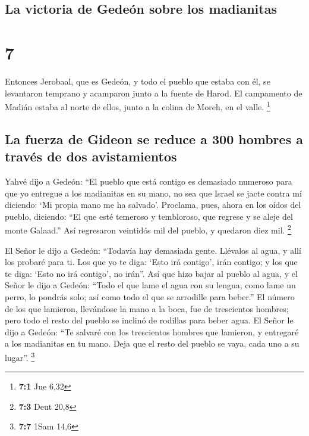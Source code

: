 \hypertarget{la-victoria-de-gedeuxf3n-sobre-los-madianitas}{%
\subsection{La victoria de Gedeón sobre los
madianitas}\label{la-victoria-de-gedeuxf3n-sobre-los-madianitas}}

\hypertarget{section-6}{%
\section{7}\label{section-6}}

 Entonces Jerobaal, que es Gedeón, y todo el pueblo que
estaba con él, se levantaron temprano y acamparon junto a la fuente de
Harod. El campamento de Madián estaba al norte de ellos, junto a la
colina de Moreh, en el valle. \footnote{\textbf{7:1} Jue 6,32}

\hypertarget{la-fuerza-de-gideon-se-reduce-a-300-hombres-a-travuxe9s-de-dos-avistamientos}{%
\subsection{La fuerza de Gideon se reduce a 300 hombres a través de dos
avistamientos}\label{la-fuerza-de-gideon-se-reduce-a-300-hombres-a-travuxe9s-de-dos-avistamientos}}

 Yahvé dijo a Gedeón: ``El pueblo que está contigo es
demasiado numeroso para que yo entregue a los madianitas en su mano, no
sea que Israel se jacte contra mí diciendo: `Mi propia mano me ha
salvado'.  Proclama, pues, ahora en los oídos del pueblo,
diciendo: ``El que esté temeroso y tembloroso, que regrese y se aleje
del monte Galaad.'' Así regresaron veintidós mil del pueblo, y quedaron
diez mil. \footnote{\textbf{7:3} Deut 20,8}

 El Señor le dijo a Gedeón: ``Todavía hay demasiada gente.
Llévalos al agua, y allí los probaré para ti. Los que yo te diga: `Esto
irá contigo', irán contigo; y los que te diga: `Esto no irá contigo', no
irán''.  Así que hizo bajar al pueblo al agua, y el Señor
le dijo a Gedeón: ``Todo el que lame el agua con su lengua, como lame un
perro, lo pondrás solo; así como todo el que se arrodille para beber.''
 El número de los que lamieron, llevándose la mano a la
boca, fue de trescientos hombres; pero todo el resto del pueblo se
inclinó de rodillas para beber agua.  El Señor le dijo a
Gedeón: ``Te salvaré con los trescientos hombres que lamieron, y
entregaré a los madianitas en tu mano. Deja que el resto del pueblo se
vaya, cada uno a su lugar''. \footnote{\textbf{7:7} 1Sam 14,6}

